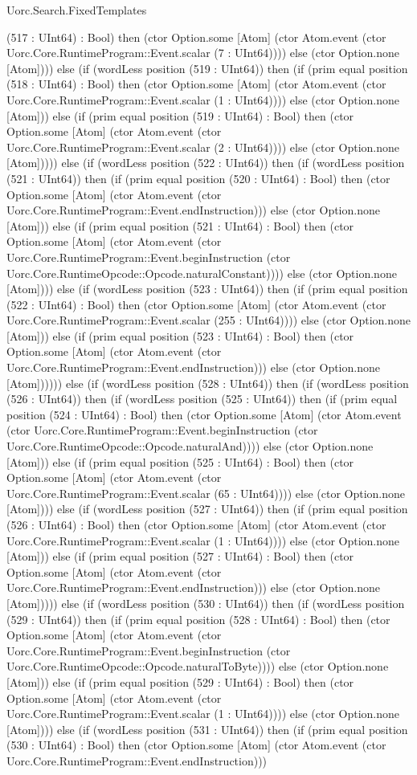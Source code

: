 \begin{lexlean}{Uorc.Search.FixedTemplates}
\begin{semanticmodule}
{(517 : UInt64) : Bool) then (ctor Option.some [Atom] (ctor Atom.event (ctor Uorc.Core.RuntimeProgram::Event.scalar (7 : UInt64)))) else (ctor Option.none [Atom]))) else (if (wordLess position (519 : UInt64)) then (if (prim equal position (518 : UInt64) : Bool) then (ctor Option.some [Atom] (ctor Atom.event (ctor Uorc.Core.RuntimeProgram::Event.scalar (1 : UInt64)))) else (ctor Option.none [Atom])) else (if (prim equal position (519 : UInt64) : Bool) then (ctor Option.some [Atom] (ctor Atom.event (ctor Uorc.Core.RuntimeProgram::Event.scalar (2 : UInt64)))) else (ctor Option.none [Atom])))) else (if (wordLess position (522 : UInt64)) then (if (wordLess position (521 : UInt64)) then (if (prim equal position (520 : UInt64) : Bool) then (ctor Option.some [Atom] (ctor Atom.event (ctor Uorc.Core.RuntimeProgram::Event.endInstruction))) else (ctor Option.none [Atom])) else (if (prim equal position (521 : UInt64) : Bool) then (ctor Option.some [Atom] (ctor Atom.event (ctor Uorc.Core.RuntimeProgram::Event.beginInstruction (ctor Uorc.Core.RuntimeOpcode::Opcode.naturalConstant)))) else (ctor Option.none [Atom]))) else (if (wordLess position (523 : UInt64)) then (if (prim equal position (522 : UInt64) : Bool) then (ctor Option.some [Atom] (ctor Atom.event (ctor Uorc.Core.RuntimeProgram::Event.scalar (255 : UInt64)))) else (ctor Option.none [Atom])) else (if (prim equal position (523 : UInt64) : Bool) then (ctor Option.some [Atom] (ctor Atom.event (ctor Uorc.Core.RuntimeProgram::Event.endInstruction))) else (ctor Option.none [Atom]))))) else (if (wordLess position (528 : UInt64)) then (if (wordLess position (526 : UInt64)) then (if (wordLess position (525 : UInt64)) then (if (prim equal position (524 : UInt64) : Bool) then (ctor Option.some [Atom] (ctor Atom.event (ctor Uorc.Core.RuntimeProgram::Event.beginInstruction (ctor Uorc.Core.RuntimeOpcode::Opcode.naturalAnd)))) else (ctor Option.none [Atom])) else (if (prim equal position (525 : UInt64) : Bool) then (ctor Option.some [Atom] (ctor Atom.event (ctor Uorc.Core.RuntimeProgram::Event.scalar (65 : UInt64)))) else (ctor Option.none [Atom]))) else (if (wordLess position (527 : UInt64)) then (if (prim equal position (526 : UInt64) : Bool) then (ctor Option.some [Atom] (ctor Atom.event (ctor Uorc.Core.RuntimeProgram::Event.scalar (1 : UInt64)))) else (ctor Option.none [Atom])) else (if (prim equal position (527 : UInt64) : Bool) then (ctor Option.some [Atom] (ctor Atom.event (ctor Uorc.Core.RuntimeProgram::Event.endInstruction))) else (ctor Option.none [Atom])))) else (if (wordLess position (530 : UInt64)) then (if (wordLess position (529 : UInt64)) then (if (prim equal position (528 : UInt64) : Bool) then (ctor Option.some [Atom] (ctor Atom.event (ctor Uorc.Core.RuntimeProgram::Event.beginInstruction (ctor Uorc.Core.RuntimeOpcode::Opcode.naturalToByte)))) else (ctor Option.none [Atom])) else (if (prim equal position (529 : UInt64) : Bool) then (ctor Option.some [Atom] (ctor Atom.event (ctor Uorc.Core.RuntimeProgram::Event.scalar (1 : UInt64)))) else (ctor Option.none [Atom]))) else (if (wordLess position (531 : UInt64)) then (if (prim equal position (530 : UInt64) : Bool) then (ctor Option.some [Atom] (ctor Atom.event (ctor Uorc.Core.RuntimeProgram::Event.endInstruction))) }
\end{semanticmodule}
\end{lexlean}
